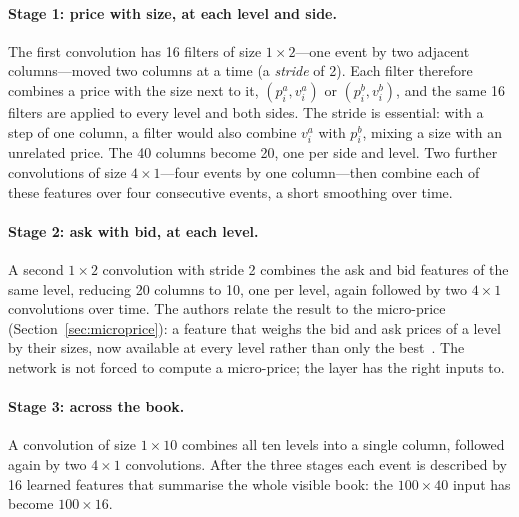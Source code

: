 \paragraph{Stage 1: price with size, at each level and side.} The first convolution has 16 filters of size
$1 \times 2$---one event by two adjacent columns---moved two columns at a time (a \emph{stride} of 2). Each filter
therefore combines a price with the size next to it, $(p^a_i, v^a_i)$ or $(p^b_i, v^b_i)$, and the same 16 filters are
applied to every level and both sides. The stride is essential: with a step of one column, a filter would also
combine $v^a_i$ with $p^b_i$, mixing a size with an unrelated price. The 40 columns become 20, one per side and
level. Two further convolutions of size $4 \times 1$---four events by one column---then combine each of these features over
four consecutive events, a short smoothing over time.

\paragraph{Stage 2: ask with bid, at each level.} A second $1 \times 2$ convolution with stride 2 combines the ask
and bid features of the same level, reducing 20 columns to 10, one per level, again followed by two $4 \times 1$
convolutions over time. The authors relate the result to the micro-price (Section~\ref{sec:microprice}): a feature
that weighs the bid and ask prices of a level by their sizes, now available at every level rather than only the
best~\citep{zhang2019}. The network is not forced to compute a micro-price; the layer has the right inputs to.

\paragraph{Stage 3: across the book.} A convolution of size $1 \times 10$ combines all ten levels into a single
column, followed again by two $4 \times 1$ convolutions. After the three stages each event is described by 16
learned features that summarise the whole visible book: the $100 \times 40$ input has become $100 \times 16$.

